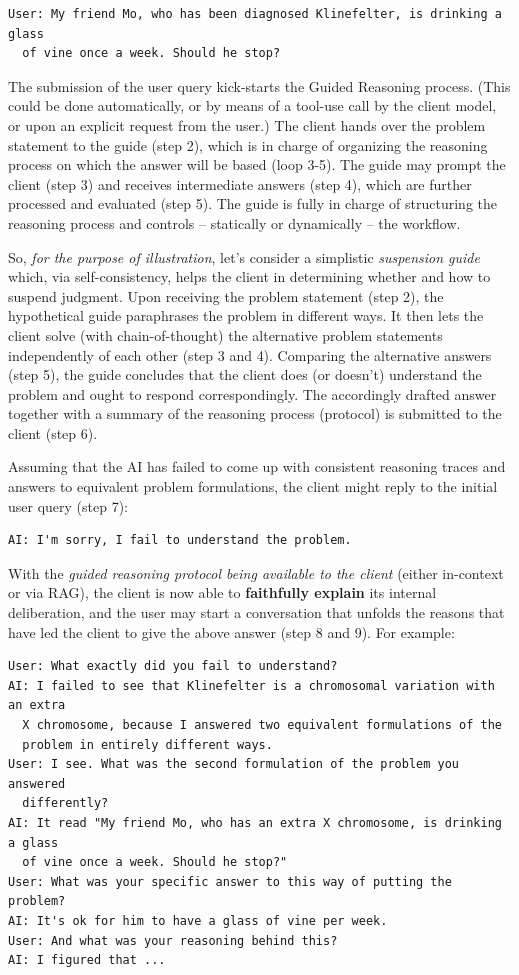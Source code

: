 \documentclass[
  letterpaper,
  DIV=11,
  numbers=noendperiod]{scrartcl}
\begin{document}
\begin{verbatim}
User: My friend Mo, who has been diagnosed Klinefelter, is drinking a glass
  of vine once a week. Should he stop?
\end{verbatim}

The submission of the user query kick-starts the Guided Reasoning
process. (This could be done automatically, or by means of a tool-use
call by the client model, or upon an explicit request from the user.)
The client hands over the problem statement to the guide (step 2), which
is in charge of organizing the reasoning process on which the answer
will be based (loop 3-5). The guide may prompt the client (step 3) and
receives intermediate answers (step 4), which are further processed and
evaluated (step 5). The guide is fully in charge of structuring the
reasoning process and controls -- statically or dynamically -- the
workflow.

So, \emph{for the purpose of illustration}, let's consider a simplistic
\emph{suspension guide} which, via self-consistency, helps the client in
determining whether and how to suspend judgment. Upon receiving the
problem statement (step 2), the hypothetical guide paraphrases the
problem in different ways. It then lets the client solve (with
chain-of-thought) the alternative problem statements independently of
each other (step 3 and 4). Comparing the alternative answers (step 5),
the guide concludes that the client does (or doesn't) understand the
problem and ought to respond correspondingly. The accordingly drafted
answer together with a summary of the reasoning process (protocol) is
submitted to the client (step 6).

Assuming that the AI has failed to come up with consistent reasoning
traces and answers to equivalent problem formulations, the client might
reply to the initial user query (step 7):

\begin{verbatim}
AI: I'm sorry, I fail to understand the problem.
\end{verbatim}

With the \emph{guided reasoning protocol being available to the client}
(either in-context or via RAG), the client is now able to
\textbf{faithfully explain} its internal deliberation, and the user may
start a conversation that unfolds the reasons that have led the client
to give the above answer (step 8 and 9). For example:

\begin{verbatim}
User: What exactly did you fail to understand?
AI: I failed to see that Klinefelter is a chromosomal variation with an extra
  X chromosome, because I answered two equivalent formulations of the 
  problem in entirely different ways.
User: I see. What was the second formulation of the problem you answered
  differently?
AI: It read "My friend Mo, who has an extra X chromosome, is drinking a glass
  of vine once a week. Should he stop?"
User: What was your specific answer to this way of putting the problem?
AI: It's ok for him to have a glass of vine per week.
User: And what was your reasoning behind this?
AI: I figured that ...
\end{verbatim}
\end{document}
